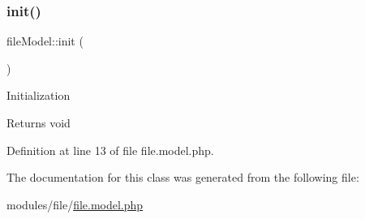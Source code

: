\subsubsection{\texorpdfstring{init()}{init()}}
{\footnotesize\ttfamily file\+Model\+::init (\begin{DoxyParamCaption}{ }\end{DoxyParamCaption})}

Initialization \begin{DoxyReturn}{Returns}
void 
\end{DoxyReturn}


Definition at line 13 of file file.\+model.\+php.



The documentation for this class was generated from the following file\+:\begin{DoxyCompactItemize}
\item 
modules/file/\hyperlink{file_8model_8php}{file.\+model.\+php}\end{DoxyCompactItemize}
